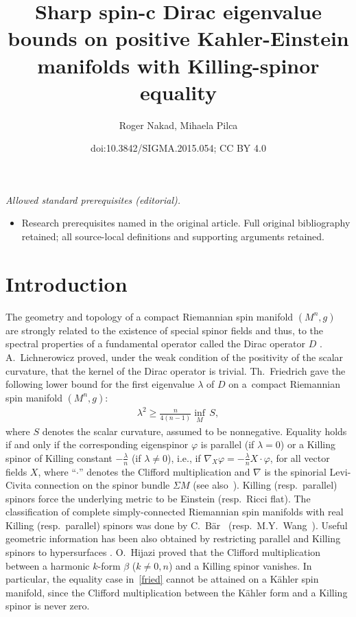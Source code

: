 \documentclass[10pt,a4paper]{amsart}
\title{Sharp spin-c Dirac eigenvalue bounds on positive Kahler-Einstein manifolds with Killing-spinor equality}
\author{Roger Nakad, Mihaela Pilca}
\date{doi:10.3842/SIGMA.2015.054; CC BY 4.0}
\numberwithin{equation}{section}
\theoremstyle{definition}
\begin{document}
\maketitle
\noindent\textit{Allowed standard prerequisites (editorial).}\begin{itemize}
\item Research prerequisites named in the original article. Full original bibliography retained; all source-local definitions and supporting arguments retained.
\end{itemize}\medskip
\section{Introduction}

The geometry and topology of a compact Riemannian spin manifold $(M^n, g)$ are strongly related to the existence of special spinor f\/ields and thus, to the spectral properties of a fundamental operator called the Dirac operator $D$ \cite{AS, lich0}.
A.~Lichnerowicz \cite{lich0} proved, under the weak condition of the positivity of the scalar curvature, that the kernel of the Dirac operator is trivial. Th.~Friedrich \cite{fr1} gave the following lower bound for the f\/irst eigenvalue $\lambda$ of $D$ on a~compact Riemannian spin manifold $(M^n, g)$:
\begin{gather}\label{fried}
\lambda^2\geq\frac{n}{4(n-1)}\underset{M}{\inf}\, S,
\end{gather}
where $S$ denotes the  scalar curvature, assumed to be nonnegative. Equality holds if and only if the corresponding eigenspinor $\varphi$ is parallel (if $\lambda=0$) or a Killing spinor of Killing constant $-\frac{\lambda}{n}$ (if $\lambda\neq0$), i.e., if $\nabla_X\varphi = -\frac{\lambda}{n} X\cdot\varphi$, for all vector f\/ields $X$, where ``$\cdot$'' denotes the Clif\/ford multiplication and $\nabla$  is the spinorial Levi-Civita connection on the spinor bundle $\Sigma M$ (see also~\cite{hijconf}). Killing (resp.\ parallel) spinors force the underlying metric to be Einstein  (resp.\ Ricci f\/lat).  The classif\/ication of complete simply-connected Riemannian spin manifolds with real Killing (resp.\ parallel) spinors was done by C.~B\"ar~\cite{baer} (resp.\ M.Y.~Wang~\cite{wang}). Useful geometric information has been also obtained by restricting parallel and Killing spinors to hypersurfaces \cite{Ba, HMZ1, HMZ2, HMZ02, HZ1, HZ2}. O.~Hijazi  proved  that the Clif\/ford multiplication between  a harmonic  $k$-form $\beta$  ($k \neq 0, n$) and a Killing spinor vanishes. In particular, the equality case  in~\eqref{fried} cannot be attained on a  K\"ahler spin manifold, since the Clif\/ford multiplication between the K\"ahler form and a Killing spinor is never zero.
\end{document}
